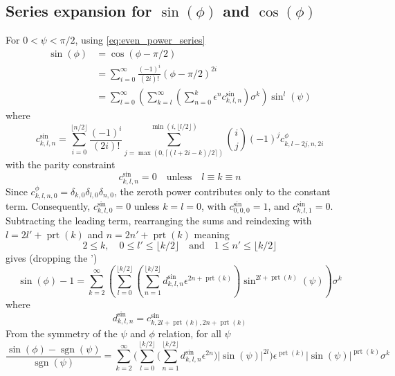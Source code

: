 \documentclass[a4paper]{amsart}
\DeclareMathOperator{\sgn}{sgn}
\DeclareMathOperator{\prt}{prt}
\begin{document}
\subsection{Series expansion for \texorpdfstring{$\sin(\phi)$ and $\cos(\phi)$}{sin(φ) and cos(φ)}}
For $0<\psi<\pi/2$, using \eqref{eq:even_power_series}
\begin{align*}
\sin(\phi)&=\cos(\phi - \pi/2)\\
&=\sum_{i=0}^\infty\frac{(-1)^i}{(2i)!}(\phi-\pi/2)^{2i}\\
&=\sum_{l=0}^\infty\left(\sum_{k=l}^\infty\left(\sum_{n=0}^k\epsilon^nc^{\sin}_{k,l,n}\right)\sigma^k\right)\sin^l(\psi)
\end{align*}
where
\begin{equation*}
c^{\sin}_{k,l,n}=\sum_{i=0}^{\lfloor n/2\rfloor}\frac{(-1)^i}{(2i)!}\sum_{j=\max(0,\lceil (l+2i-k)/2\rceil)}^{\min(i,\lfloor l/2\rfloor)}\binom{i}{j}(-1)^jc^{\phi}_{k,l-2j,n,2i}
\end{equation*}
with the parity constraint
\begin{equation*}
c^{\sin}_{k,l,n}=0\quad\text{unless}\quad l\equiv k\equiv n
\end{equation*}
Since $c^\phi_{k,l,n,0}=\delta_{k,0}\delta_{l,0}\delta_{n,0}$, the zeroth power contributes only to the constant term. Consequently, $c^{\sin}_{k,l,0}=0$ unless $k=l=0$, with $c^{\sin}_{0,0,0}=1$, and $c^{\sin}_{k,l,1}=0$.
%
Subtracting the leading term, rearranging the sums and reindexing with $l=2l'+\prt(k)$ and $n=2n'+\prt(k)$ meaning
\begin{equation*}
2\leq k,\quad0\leq l'\leq\lfloor k/2\rfloor\quad\text{and}\quad 1\leq n'\leq\lfloor k/2\rfloor
\end{equation*}
gives (dropping the ')
\begin{equation*}
\sin(\phi)-1
=
\sum_{k=2}^{\infty}
\left(
\sum_{l=0}^{\lfloor k/2\rfloor}
\left(
\sum_{n=1}^{\lfloor k/2\rfloor}
d^{\sin}_{k,l,n}
\epsilon^{2n+\prt(k)}
\right)
\sin^{2l+\prt(k)}(\psi)
\right)
\sigma^{k}
\end{equation*}
where
\begin{equation}\label{eq:d_sin}
d^{\sin}_{k,l,n}
=
c^{\sin}_{k,2l+\prt(k),2n+\prt(k)}
\end{equation}
From the symmetry of the $\psi$ and $\phi$ relation, for all $\psi$
\begin{equation*}
\frac{\sin(\phi)-\sgn(\psi)}{\sgn(\psi)}
=\!
\sum_{k=2}^{\infty}
\!\Bigg(
\sum_{l=0}^{\lfloor k/2\rfloor}
\!\Bigg(
\sum_{n=1}^{\lfloor k/2\rfloor}
d^{\sin}_{k,l,n}
\epsilon^{2n}
\Bigg)
|\sin(\psi)|^{2l}
\Bigg)
\epsilon^{\prt(k)}
|\sin(\psi)|^{\prt(k)}
\sigma^k
\end{equation*}
\end{document}
